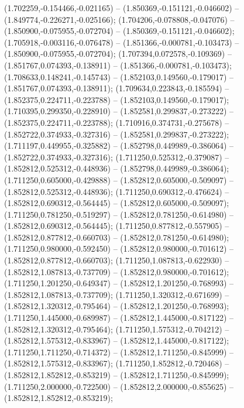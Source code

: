  (1.702259,-0.154466,-0.021165) -- (1.850369,-0.151121,-0.046602) -- (1.849774,-0.226271,-0.025166);
 (1.704206,-0.078808,-0.047076) -- (1.850900,-0.075955,-0.072704) -- (1.850369,-0.151121,-0.046602);
 (1.705918,-0.003116,-0.076478) -- (1.851366,-0.000781,-0.103473) -- (1.850900,-0.075955,-0.072704);
 (1.707394,0.072578,-0.109369) -- (1.851767,0.074393,-0.138911) -- (1.851366,-0.000781,-0.103473);
 (1.708633,0.148241,-0.145743) -- (1.852103,0.149560,-0.179017) -- (1.851767,0.074393,-0.138911);
 (1.709634,0.223843,-0.185594) -- (1.852375,0.224711,-0.223788) -- (1.852103,0.149560,-0.179017);
 (1.710395,0.299350,-0.228910) -- (1.852581,0.299837,-0.273222) -- (1.852375,0.224711,-0.223788);
 (1.710916,0.374731,-0.275678) -- (1.852722,0.374933,-0.327316) -- (1.852581,0.299837,-0.273222);
 (1.711197,0.449955,-0.325882) -- (1.852798,0.449989,-0.386064) -- (1.852722,0.374933,-0.327316);
 (1.711250,0.525312,-0.379087) -- (1.852812,0.525312,-0.448936) -- (1.852798,0.449989,-0.386064);
 (1.711250,0.605000,-0.429888) -- (1.852812,0.605000,-0.509097) -- (1.852812,0.525312,-0.448936);
 (1.711250,0.690312,-0.476624) -- (1.852812,0.690312,-0.564445) -- (1.852812,0.605000,-0.509097);
 (1.711250,0.781250,-0.519297) -- (1.852812,0.781250,-0.614980) -- (1.852812,0.690312,-0.564445);
 (1.711250,0.877812,-0.557905) -- (1.852812,0.877812,-0.660703) -- (1.852812,0.781250,-0.614980);
 (1.711250,0.980000,-0.592450) -- (1.852812,0.980000,-0.701612) -- (1.852812,0.877812,-0.660703);
 (1.711250,1.087813,-0.622930) -- (1.852812,1.087813,-0.737709) -- (1.852812,0.980000,-0.701612);
 (1.711250,1.201250,-0.649347) -- (1.852812,1.201250,-0.768993) -- (1.852812,1.087813,-0.737709);
 (1.711250,1.320312,-0.671699) -- (1.852812,1.320312,-0.795464) -- (1.852812,1.201250,-0.768993);
 (1.711250,1.445000,-0.689987) -- (1.852812,1.445000,-0.817122) -- (1.852812,1.320312,-0.795464);
 (1.711250,1.575312,-0.704212) -- (1.852812,1.575312,-0.833967) -- (1.852812,1.445000,-0.817122);
 (1.711250,1.711250,-0.714372) -- (1.852812,1.711250,-0.845999) -- (1.852812,1.575312,-0.833967);
 (1.711250,1.852812,-0.720468) -- (1.852812,1.852812,-0.853219) -- (1.852812,1.711250,-0.845999);
 (1.711250,2.000000,-0.722500) -- (1.852812,2.000000,-0.855625) -- (1.852812,1.852812,-0.853219);
